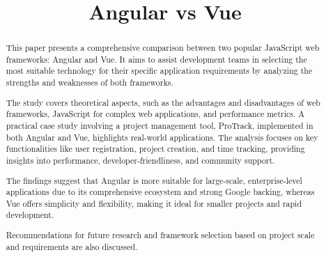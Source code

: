 \documentclass[conference]{IEEEtran}
\begin{document}
\title{Angular vs Vue\\
}

\author{
\and
{}
\and
{}
}

\maketitle

\begin{abstract}
This paper presents a comprehensive comparison between two popular JavaScript web frameworks: Angular and Vue. It aims to assist development teams in selecting the most suitable technology for their specific application requirements by analyzing the strengths and weaknesses of both frameworks.

The study covers theoretical aspects, such as the advantages and disadvantages of web frameworks, JavaScript for complex web applications, and performance metrics. A practical case study involving a project management tool, ProTrack, implemented in both Angular and Vue, highlights real-world applications. The analysis focuses on key functionalities like user registration, project creation, and time tracking, providing insights into performance, developer-friendliness, and community support.

The findings suggest that Angular is more suitable for large-scale, enterprise-level applications due to its comprehensive ecosystem and strong Google backing, whereas Vue offers simplicity and flexibility, making it ideal for smaller projects and rapid development.

Recommendations for future research and framework selection based on project scale and requirements are also discussed.
\end{abstract}
\end{document}
